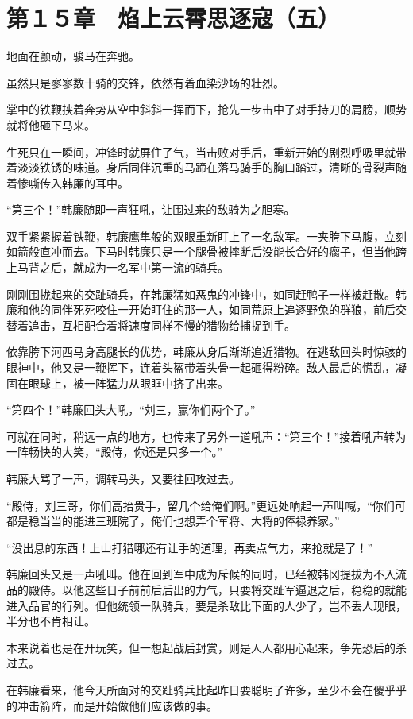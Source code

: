 \section{第１５章　焰上云霄思逐寇（五）}

地面在颤动，骏马在奔驰。

虽然只是寥寥数十骑的交锋，依然有着血染沙场的壮烈。

掌中的铁鞭挟着奔势从空中斜斜一挥而下，抢先一步击中了对手持刀的肩膀，顺势就将他砸下马来。

生死只在一瞬间，冲锋时就屏住了气，当击败对手后，重新开始的剧烈呼吸里就带着淡淡铁锈的味道。身后同伴沉重的马蹄在落马骑手的胸口踏过，清晰的骨裂声随着惨嘶传入韩廉的耳中。

“第三个！”韩廉随即一声狂吼，让围过来的敌骑为之胆寒。

双手紧紧握着铁鞭，韩廉鹰隼般的双眼重新盯上了一名敌军。一夹胯下马腹，立刻如箭般直冲而去。下马时韩廉只是一个腿骨被摔断后没能长合好的瘸子，但当他跨上马背之后，就成为一名军中第一流的骑兵。

刚刚围拢起来的交趾骑兵，在韩廉猛如恶鬼的冲锋中，如同赶鸭子一样被赶散。韩廉和他的同伴死死咬住一开始盯住的那一人，如同荒原上追逐野兔的群狼，前后交替着追击，互相配合着将速度同样不慢的猎物给捕捉到手。

依靠胯下河西马身高腿长的优势，韩廉从身后渐渐追近猎物。在逃敌回头时惊骇的眼神中，他又是一鞭挥下，连着头盔带着头骨一起砸得粉碎。敌人最后的慌乱，凝固在眼球上，被一阵猛力从眼眶中挤了出来。

“第四个！”韩廉回头大吼，“刘三，赢你们两个了。”

可就在同时，稍远一点的地方，也传来了另外一道吼声：“第三个！”接着吼声转为一阵畅快的大笑，“殿侍，你还是只多一个。”

韩廉大骂了一声，调转马头，又要往回攻过去。

“殿侍，刘三哥，你们高抬贵手，留几个给俺们啊。”更远处响起一声叫喊，“你们可都是稳当当的能进三班院了，俺们也想弄个军将、大将的俸禄养家。”

“没出息的东西！上山打猎哪还有让手的道理，再卖点气力，来抢就是了！”

韩廉回头又是一声吼叫。他在回到军中成为斥候的同时，已经被韩冈提拔为不入流品的殿侍。以他这些日子前前后后出的力气，只要将交趾军逼退之后，稳稳的就能进入品官的行列。但他统领一队骑兵，要是杀敌比下面的人少了，岂不丢人现眼，半分也不肯相让。

本来说着也是在开玩笑，但一想起战后封赏，则是人人都用心起来，争先恐后的杀过去。

在韩廉看来，他今天所面对的交趾骑兵比起昨日要聪明了许多，至少不会在傻乎乎的冲击箭阵，而是开始做他们应该做的事。

